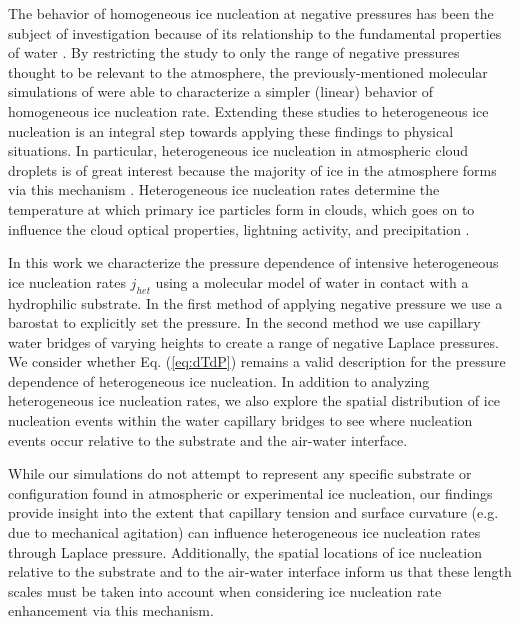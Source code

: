 \documentclass[journal abbreviation, manuscript]{copernicus}
\begin{document}
The behavior of homogeneous ice nucleation at negative pressures has been the subject of investigation because of its relationship to the fundamental properties of water \citep[e.g.,][]{bianco2021}. By restricting the study to only the range of negative pressures thought to be relevant to the atmosphere, the previously-mentioned molecular simulations of \citet{rosky2022} were able to characterize a simpler (linear) behavior of homogeneous ice nucleation rate. Extending these studies to heterogeneous ice nucleation is an integral step towards applying these findings to physical situations. In particular, heterogeneous ice nucleation in atmospheric cloud droplets is of great interest because the majority of ice in the atmosphere forms via this mechanism \citep{cantrell2005production,hoose2012heterogeneous}. Heterogeneous ice nucleation rates determine the temperature at which primary ice particles form in clouds, which goes on to influence the cloud optical properties, lightning activity, and precipitation \citep{lamb2011physics}. 

In this work we characterize the pressure dependence of intensive heterogeneous ice nucleation rates $j_{het}$ using a molecular model of water in contact with a hydrophilic substrate. In the first method of applying negative pressure we use a barostat to explicitly set the pressure. In the second method we use capillary water bridges of varying heights to create a range of negative Laplace pressures. We consider whether Eq. (\ref{eq:dTdP}) remains a valid description for the pressure dependence of heterogeneous ice nucleation. In addition to analyzing heterogeneous ice nucleation rates, we also explore the spatial distribution of ice nucleation events within the water capillary bridges to see where nucleation events occur relative to the substrate and the air-water interface. %

While our simulations do not attempt to represent any specific substrate or configuration found in atmospheric or experimental ice nucleation, our findings provide insight into the extent that capillary tension and surface curvature (e.g. due to mechanical agitation) can influence heterogeneous ice nucleation rates through Laplace pressure.  Additionally, the spatial locations of ice nucleation relative to the substrate and to the air-water interface inform us that these length scales must be taken into account when considering ice nucleation rate enhancement via this mechanism.
\end{document}
